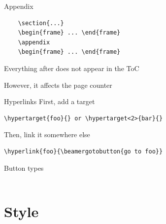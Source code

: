 \documentclass[xcolor=x11names, xcolor=table]{beamer}
\begin{document}
\begin{frame}[fragile]{Appendix}
\begin{verbatim}
    \section{...}
    \begin{frame} ... \end{frame}
    \appendix
    \begin{frame} ... \end{frame}
\end{verbatim}
Everything after \texttt{\appendix} does not appear in the ToC

\vspace{.5em}
However, it affects the page counter
\end{frame}


\begin{frame}[fragile]{Hyperlinks}
First, add a target

\begin{verbatim}
\hypertarget{foo}{} or \hypertarget<2>{bar}{}
\end{verbatim}

Then, link it somewhere else
\begin{verbatim}
\hyperlink{foo}{\beamergotobutton{go to foo}}
\end{verbatim}

\begin{block}{Button types}
\texttt{}\\
\texttt{}\\
\texttt{}
\end{block}
\end{frame}


\section{Style}
\end{document}
